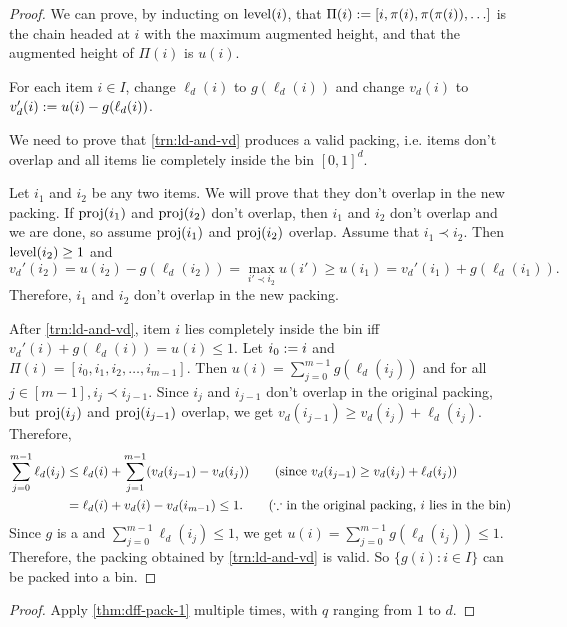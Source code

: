 \begin{proof}
We can prove, by inducting on $\operatorname{level}(i)$, that
$\Pi(i) := [i, \pi(i), \pi(\pi(i)), \ldots]$ is the chain headed at $i$ with
the maximum augmented height, and that the augmented height of $\Pi(i)$ is $u(i)$.

\begin{transformation}
\label{trn:ld-and-vd}
For each item $i \in I$, change $\ell_d(i)$ to $g(\ell_d(i))$
and change $v_d(i)$ to $v_d'(i) := u(i) - g(\ell_d(i))$.
\end{transformation}

We need to prove that \cref{trn:ld-and-vd} produces a valid packing,
i.e. items don't overlap and all items lie completely inside the bin $[0, 1]^d$.

Let $i_1$ and $i_2$ be any two items. We will prove that they don't overlap in the new packing.
If $\operatorname{proj}(i_1)$ and $\operatorname{proj}(i_2)$ don't overlap, then $i_1$ and $i_2$ don't overlap
and we are done, so assume $\operatorname{proj}(i_1)$ and $\operatorname{proj}(i_2)$ overlap.
Assume \wLoG{} that $i_1 \prec i_2$. Then $\operatorname{level}(i_2) \ge 1$ and
\[ v_d'(i_2) = u(i_2) - g(\ell_d(i_2)) = \max_{i' \prec i_2} u(i')
\ge u(i_1) = v_d'(i_1) + g(\ell_d(i_1)). \]
Therefore, $i_1$ and $i_2$ don't overlap in the new packing.

After \cref{trn:ld-and-vd}, item $i$ lies completely inside the bin
iff $v_d'(i) + g(\ell_d(i)) = u(i) \le 1$. Let $i_0 := i$ and
$\Pi(i) = [i_0, i_1, i_2, \ldots, i_{m-1}]$.
Then $u(i) = \sum_{j=0}^{m-1} g(\ell_d(i_j))$ and for all $j \in [m-1], i_j \prec i_{j-1}$.
Since $i_j$ and $i_{j-1}$ don't overlap in the original packing,
but $\operatorname{proj}(i_j)$ and $\operatorname{proj}(i_{j-1})$ overlap,
we get $v_d(i_{j-1}) \ge v_d(i_j) + \ell_d(i_j)$. Therefore,
\begin{align*}
\sum_{j=0}^{m-1} \ell_d(i_j)
&\le \ell_d(i) + \sum_{j=1}^{m-1} (v_d(i_{j-1}) - v_d(i_j))
\tag{since $v_d(i_{j-1}) \ge v_d(i_j) + \ell_d(i_j)$}
\\ &= \ell_d(i) + v_d(i) - v_d(i_{m-1})
\le 1.
\tag{$\because$ in the original packing, $i$ lies in the bin}
\end{align*}
Since $g$ is a \dff{} and $\sum_{j=0}^{m-1} \ell_d(i_j) \le 1$,
we get $u(i) = \sum_{j=0}^{m-1} g(\ell_d(i_j)) \le 1$.
Therefore, the packing obtained by \cref{trn:ld-and-vd} is valid.
So $\{g(i): i \in I\}$ can be packed into a bin.
\end{proof}

\rthmDffPack*
\begin{proof}[Proof]
Apply \cref{thm:dff-pack-1} multiple times, with $q$ ranging from $1$ to $d$.
\end{proof}
